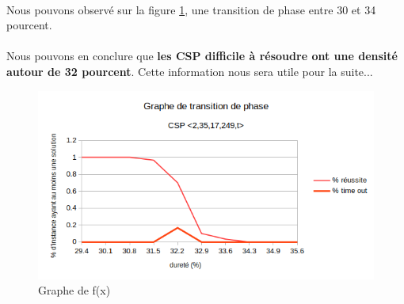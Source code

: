 \documentclass[a4paper]{article}
\begin{document}
  \paragraph{}
    Nous pouvons observé sur la figure \ref{fig:graphTransi}, une transition de phase entre 30 et 34 pourcent.
  \paragraph{}
    Nous pouvons en conclure que \textbf{les CSP difficile à résoudre ont une densité autour de 32 pourcent}. Cette information nous sera utile pour la suite...
  \begin{figure}
				\centering
				\includegraphics[width=1.2\textwidth]{graphTransition.png}
				\caption{Graphe de f(x)}
				\label{fig:graphTransi}
	\end{figure}
\end{document}

